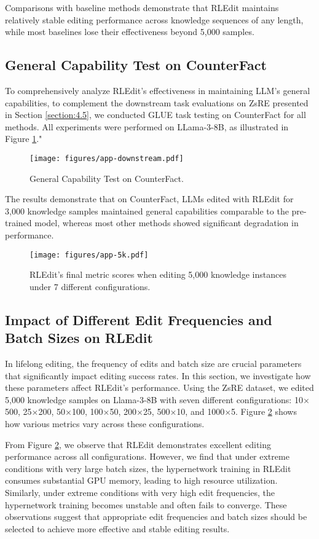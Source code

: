 Comparisons with baseline methods demonstrate that RLEdit maintains relatively stable editing performance across knowledge sequences of any length, while most baselines lose their effectiveness beyond 5,000 samples.

\subsection{General Capability Test on CounterFact}
To comprehensively analyze RLEdit's effectiveness in maintaining LLM's general capabilities, to complement the downstream task evaluations on ZsRE presented in Section \ref{section:4.5}, we conducted GLUE task testing on CounterFact for all methods. All experiments were performed on LLama-3-8B, as illustrated in Figure \ref{fig:downstream-cf}."
\begin{figure}[t]
    \centering
    \texttt{[image: figures/app-downstream.pdf]}
    \caption{General Capability Test on CounterFact.}
    \label{fig:downstream-cf}
\end{figure}

The results demonstrate that on CounterFact, LLMs edited with RLEdit for 3,000 knowledge samples maintained general capabilities comparable to the pre-trained model, whereas most other methods showed significant degradation in performance.

\begin{figure}[t]
    \centering
    \texttt{[image: figures/app-5k.pdf]}
    \caption{RLEdit's final metric scores when editing 5,000 knowledge instances under 7 different configurations.}
    \label{fig:5k}
\end{figure}

\subsection{Impact of Different Edit Frequencies and Batch Sizes on RLEdit}
In lifelong editing, the frequency of edits and batch size are crucial parameters that significantly impact editing success rates. In this section, we investigate how these parameters affect RLEdit's performance. Using the ZsRE dataset, we edited 5,000 knowledge samples on Llama-3-8B with seven different configurations: 10$\times$500, 25$\times$200, 50$\times$100, 100$\times$50, 200$\times$25, 500$\times$10, and 1000$\times$5. Figure \ref{fig:5k} shows how various metrics vary across these configurations.

From Figure \ref{fig:5k}, we observe that RLEdit demonstrates excellent editing performance across all configurations. However, we find that under extreme conditions with very large batch sizes, the hypernetwork training in RLEdit consumes substantial GPU memory, leading to high resource utilization. Similarly, under extreme conditions with very high edit frequencies, the hypernetwork training becomes unstable and often fails to converge. These observations suggest that appropriate edit frequencies and batch sizes should be selected to achieve more effective and stable editing results.



